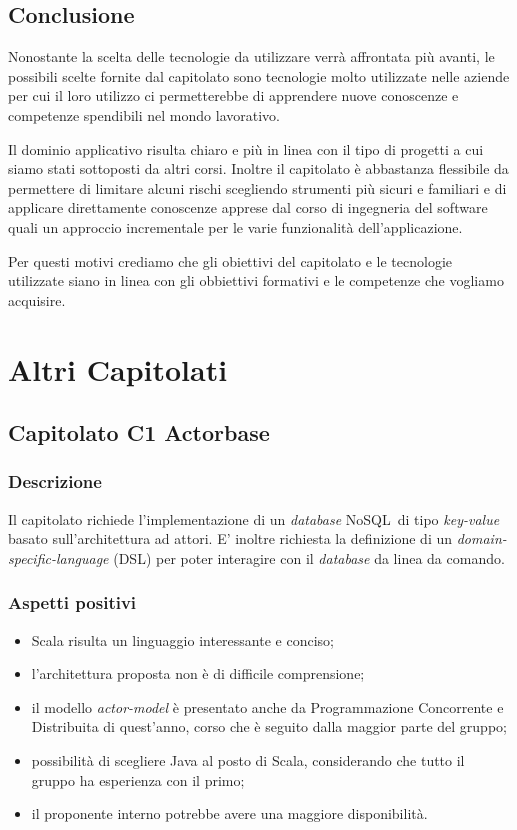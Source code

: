 \documentclass[12pt,a4paper]{article}
\begin{document}
\subsection{Conclusione}

Nonostante la scelta delle tecnologie da utilizzare verrà affrontata più avanti, le possibili scelte fornite dal capitolato sono tecnologie molto utilizzate nelle aziende per cui il loro utilizzo ci permetterebbe di apprendere nuove conoscenze e competenze spendibili nel mondo lavorativo.

Il dominio applicativo risulta chiaro e più in linea con il tipo di progetti a cui siamo stati sottoposti da altri corsi. Inoltre il capitolato è abbastanza flessibile da permettere di limitare alcuni rischi scegliendo strumenti più sicuri e familiari e di applicare direttamente conoscenze apprese dal corso di ingegneria del software quali un approccio incrementale per le varie funzionalità dell'applicazione.

Per questi motivi crediamo che gli obiettivi del capitolato e le tecnologie utilizzate siano in linea con gli obbiettivi formativi e le competenze che vogliamo acquisire.

\newpage
\section{Altri Capitolati}

\subsection{Capitolato C1 Actorbase}
\subsubsection{Descrizione}

Il capitolato richiede l'implementazione di un \textit{database} NoSQL\ di tipo \textit{key-value} basato
sull'architettura ad attori. E' inoltre richiesta la definizione di un \textit{domain-specific-language} (DSL)
per poter interagire con il \textit{database} da linea da comando.

\subsubsection{Aspetti positivi}
\begin{itemize}
\item Scala risulta un linguaggio interessante e conciso;
\item l'architettura proposta non è di difficile comprensione;
\item il modello \textit{actor-model} è presentato anche da Programmazione Concorrente e Distribuita di quest'anno, corso che è seguito dalla maggior parte del gruppo;
\item possibilità di scegliere Java al posto di Scala, considerando che tutto il gruppo ha esperienza con il primo;
\item il proponente interno potrebbe avere una maggiore disponibilità.
\end{itemize}
\end{document}
